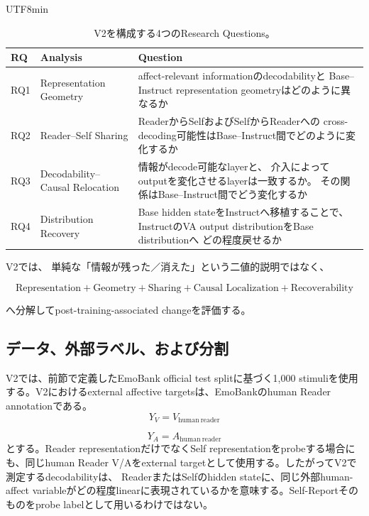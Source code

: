 \documentclass{article} %
\begin{document}
\begin{CJK*}{UTF8}{min}
\begin{table}[htbp]
\centering
\small
\caption{V2を構成する4つのResearch Questions。}
\label{tab:v2-rq-overview}
\begin{tabularx}{\linewidth}{
@{}
>{\raggedright\arraybackslash}p{1.3cm}
>{\raggedright\arraybackslash}p{3.1cm}
>{\raggedright\arraybackslash}X
@{}
}
\toprule
\textbf{RQ} &
\textbf{Analysis} &
\textbf{Question} \\
\midrule
RQ1 &
Representation Geometry &
affect-relevant informationのdecodabilityと
Base--Instruct representation geometryはどのように異なるか \\

RQ2 &
Reader--Self Sharing &
ReaderからSelfおよびSelfからReaderへの
cross-decoding可能性はBase--Instruct間でどのように変化するか \\

RQ3 &
Decodability--Causal Relocation &
情報がdecode可能なlayerと、
介入によってoutputを変化させるlayerは一致するか。
その関係はBase--Instruct間でどう変化するか \\

RQ4 &
Distribution Recovery &
Base hidden stateをInstructへ移植することで、
InstructのVA output distributionをBase distributionへ
どの程度戻せるか \\
\bottomrule
\end{tabularx}
\end{table}

V2では、
単純な「情報が残った／消えた」という二値的説明ではなく、

\[
\text{Representation}
+
\text{Geometry}
+
\text{Sharing}
+
\text{Causal Localization}
+
\text{Recoverability}
\]

へ分解してpost-training-associated changeを評価する。


\subsection{データ、外部ラベル、および分割}

V2では、前節で定義したEmoBank official test splitに基づく1,000 stimuliを使用する。V2におけるexternal affective targetsは、EmoBankのhuman Reader annotationである。
\[
Y_V
=
V_{\mathrm{human\ reader}}
\]

\[
Y_A
=
A_{\mathrm{human\ reader}}
\]
とする。Reader representationだけでなくSelf representationをprobeする場合にも、同じhuman Reader V/Aをexternal targetとして使用する。したがってV2で測定するdecodabilityは、
ReaderまたはSelfのhidden stateに、同じ外部human-affect variableがどの程度linearに表現されているかを意味する。Self-Reportそのものをprobe labelとして用いるわけではない。



\end{CJK*}
\end{document}
